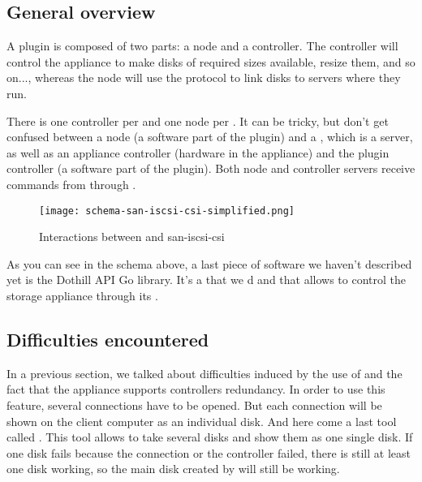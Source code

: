 \subsection{General overview}

A  plugin is composed of two parts: a node and a controller. The controller will control the appliance to make disks of required sizes available, resize them, and so on..., whereas the node will use the  protocol to link disks to servers where they run.

There is one controller per  and one node per  . It can be tricky, but don't get confused between a  node (a software part of the plugin) and a  , which is a server, as well as an appliance controller (hardware in the appliance) and the plugin controller (a software part of the plugin). Both node and controller servers receive  commands from  through .

\begin{figure}[h]
    \centering
    \texttt{[image: schema-san-iscsi-csi-simplified.png]}
    \caption{Interactions between  and \gls{san-iscsi-csi}}
    \label{fig:k8s-san-scsi-csi}
\end{figure}

As you can see in the schema above, a last piece of software we haven't described yet is the Dothill API Go library. It's a  that we d and that allows to control the storage appliance through its .

\subsection{Difficulties encountered}

In a previous section, we talked about difficulties induced by the use of  and the fact that the appliance supports controllers redundancy. In order to use this feature, several  connections have to be opened. But each connection will be shown on the client computer as an individual disk. And here come a last tool called . This tool allows to take several disks and show them as one single disk. If one disk fails because the connection or the controller failed, there is still at least one disk working, so the main disk created by  will still be working.

